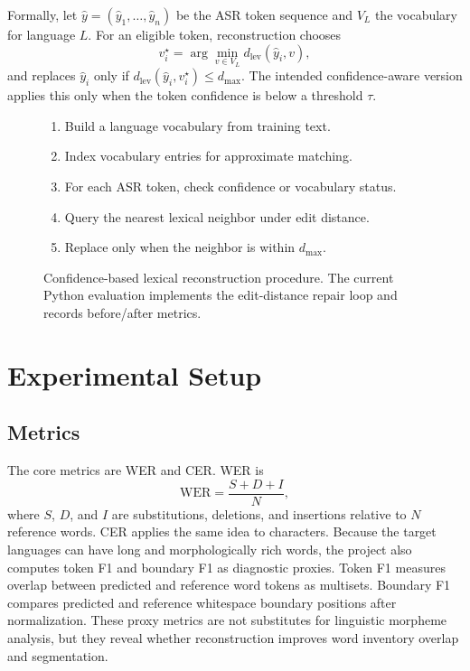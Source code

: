 \documentclass[11pt]{article}
\begin{document}
Formally, let $\hat{y}=(\hat{y}_1,\ldots,\hat{y}_n)$ be the ASR token sequence and $V_L$ the vocabulary for language $L$. For an eligible token, reconstruction chooses
\begin{equation}
v_i^\star = \arg\min_{v \in V_L} d_{\mathrm{lev}}(\hat{y}_i, v),
\end{equation}
and replaces $\hat{y}_i$ only if $d_{\mathrm{lev}}(\hat{y}_i,v_i^\star)\le d_{\max}$. The intended confidence-aware version applies this only when the token confidence is below a threshold $\tau$.

\begin{figure}[t]
\small
\begin{enumerate}
    \item Build a language vocabulary from training text.
    \item Index vocabulary entries for approximate matching.
    \item For each ASR token, check confidence or vocabulary status.
    \item Query the nearest lexical neighbor under edit distance.
    \item Replace only when the neighbor is within $d_{\max}$.
\end{enumerate}
\caption{Confidence-based lexical reconstruction procedure. The current Python evaluation implements the edit-distance repair loop and records before/after metrics.}
\label{fig:algorithm}
\end{figure}

\section{Experimental Setup}

\subsection{Metrics}

The core metrics are WER and CER. WER is
\begin{equation}
\mathrm{WER} = \frac{S + D + I}{N},
\end{equation}
where $S$, $D$, and $I$ are substitutions, deletions, and insertions relative to $N$ reference words. CER applies the same idea to characters. Because the target languages can have long and morphologically rich words, the project also computes token F1 and boundary F1 as diagnostic proxies. Token F1 measures overlap between predicted and reference word tokens as multisets. Boundary F1 compares predicted and reference whitespace boundary positions after normalization. These proxy metrics are not substitutes for linguistic morpheme analysis, but they reveal whether reconstruction improves word inventory overlap and segmentation.
\end{document}
